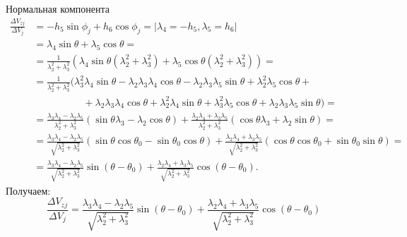 \documentclass[9pt]{beamer}
\begin{document}
\begin{frame}{Нормальная компонента}
\begin{equation*}
    \begin{aligned}
        \frac{\Delta V_{zj}}{\Delta V_j} &= -h_5 \sin \phi_j + h_6 \cos \phi_j = \vert \lambda_4 = -h_5, \lambda_5 = h_6 \vert \\
        &= \lambda_4 \sin \theta + \lambda_5 \cos \theta = \\
        &= \frac{1}{\lambda_2^2 + \lambda_3^2} \left( \lambda_4 \sin \theta (\lambda_2^2 + \lambda_3^2) + \lambda_5 \cos \theta (\lambda_2^2 + \lambda_3^2) \right) = \\
        &= \frac{1}{\lambda_2^2 + \lambda_3^2} \bigl( \lambda_3^2 \lambda_4 \sin \theta - \lambda_2 \lambda_3 \lambda_4 \cos \theta - \lambda_2 \lambda_3 \lambda_5 \sin \theta + \lambda_2^2 \lambda_5 \cos \theta + \\ 
        & \quad \quad \quad \quad \quad + \lambda_2 \lambda_3 \lambda_4 \cos \theta + \lambda_2^2 \lambda_4 \sin \theta + \lambda_3^2 \lambda_5 \cos \theta + \lambda_2 \lambda_3 \lambda_5 \sin \theta \bigr) = \\
        &= \frac{\lambda_3 \lambda_4 - \lambda_2 \lambda_5}{\lambda_2^2 + \lambda_3^2} \left( \sin \theta \lambda_3 - \lambda_2 \cos \theta \right) + \frac{\lambda_2 \lambda_4 + \lambda_3 \lambda_5}{\lambda_2^2 + \lambda_3^2} \left( \cos \theta \lambda_3 + \lambda_2 \sin \theta \right) = \\
        &= \frac{\lambda_3 \lambda_4 - \lambda_2 \lambda_5}{\sqrt{\lambda_2^2 + \lambda_3^2}} \left( \sin \theta \cos \theta_0 - \sin \theta_0 \cos \theta \right) + \frac{\lambda_2 \lambda_4 + \lambda_3 \lambda_5}{\sqrt{\lambda_2^2 + \lambda_3^2}} \left( \cos \theta \cos \theta_0 + \sin \theta_0 \sin \theta \right) = \\
        &= \frac{\lambda_3 \lambda_4 - \lambda_2 \lambda_5}{\sqrt{\lambda_2^2 + \lambda_3^2}} \sin (\theta - \theta_0) + \frac{\lambda_2 \lambda_4 + \lambda_3 \lambda_5}{\sqrt{\lambda_2^2 + \lambda_3^2}} \cos (\theta - \theta_0).
    \end{aligned}
\end{equation*}
Получаем:
\begin{equation*}
    \boxed{\frac{\Delta V_{zj}}{\Delta V_j} = \frac{\lambda_3 \lambda_4 - \lambda_2 \lambda_5}{\sqrt{\lambda_2^2 + \lambda_3^2}} \sin (\theta - \theta_0) + \frac{\lambda_2 \lambda_4 + \lambda_3 \lambda_5}{\sqrt{\lambda_2^2 + \lambda_3^2}} \cos (\theta - \theta_0)}
\end{equation*}
\end{frame}
\end{document}
